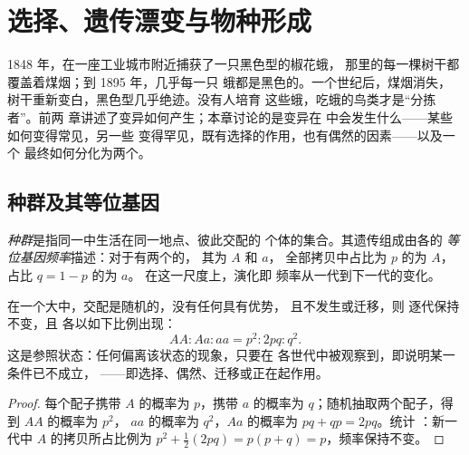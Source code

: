 \chapter{选择、遗传漂变与物种形成}\label{ch:g12:selection-drift-speciation}

1848 年，在一座工业城市附近捕获了一只黑色型的椒花蛾，
那里的每一棵树干都覆盖着煤烟；到 1895 年，几乎每一只
蛾都是黑色的。一个世纪后，煤烟消失，
树干重新变白，黑色型几乎绝迹。没有人培育
这些蛾，吃蛾的鸟类才是“分拣者”。前两
章讲述了变异如何产生；本章讨论的是变异在
中会发生什么——某些如何变得常见，另一些
变得罕见，既有选择的作用，也有偶然的因素——以及一个
最终如何分化为两个。

\section{种群及其等位基因}

\begin{definition}[种群，等位基因频率]\label{def:g12:selection-drift-speciation:population}
\emph{种群}是指同一中生活在同一地点、彼此交配的
个体的集合。其遗传组成由各的
\emph{等位基因频率}描述：对于有两个的，
其为 $A$ 和 $a$，
全部拷贝中占比为 $p$ 的为 $A$，占比 $q = 1 - p$ 的为 $a$。
在这一尺度上，演化即
频率从一代到下一代的变化。
\end{definition}

\begin{proposition}[无外力作用时的频率]\label{prop:g12:selection-drift-speciation:hw}
在一个大中，交配是随机的，没有任何具有优势，
且不发生或迁移，则
逐代保持不变，且
各以如下比例出现：
\[
AA : Aa : aa = p^2 : 2pq : q^2 .
\]
这是参照状态：任何偏离该状态的现象，只要在
各世代中被观察到，即说明某一条件已不成立，
——即选择、偶然、迁移或正在起作用。
\end{proposition}
\begin{proof}
每个配子携带 $A$ 的概率为 $p$，携带 $a$ 的概率为
$q$；随机抽取两个配子，得到 $AA$ 的概率为 $p^2$，
$aa$ 的概率为 $q^2$，$Aa$ 的概率为 $pq + qp = 2pq$。统计
：新一代中 $A$ 的拷贝所占比例为 $p^2 + \tfrac12 (2pq) =
p(p + q) = p$，频率保持不变。
\end{proof}

